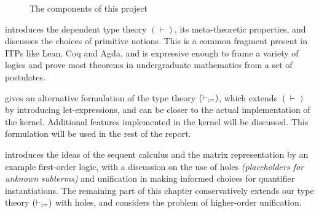 \documentclass[twoside]{report}
\begin{document}
\begin{figure}[ht]
    \centering
    \caption{The components of this project}
    \label{fig:introduction_components_of_zenith}
\end{figure}

 introduces the dependent type theory $(\vdash)$, its meta-theoretic properties, and discusses the choices of primitive notions. This is a common fragment present in ITPs like Lean, Coq and Agda, and is expressive enough to frame a variety of logics and prove most theorems in undergraduate mathematics from a set of postulates.

 gives an alternative formulation of the type theory $(\vdash_{:=})$, which extends $(\vdash)$ by introducing let-expressions, and can be closer to the actual implementation of the kernel. Additional features implemented in the kernel will be discussed. This formulation will be used in the rest of the report.

 introduces the ideas of the sequent calculus and the matrix representation by an example first-order logic, with a discussion on the use of holes \emph{(placeholders for unknown subterms)} and unification in making informed choices for quantifier instantiations. The remaining part of this chapter conservatively extends our type theory $(\vdash_{:=})$ with holes, and considers the problem of higher-order unification.
\end{document}
